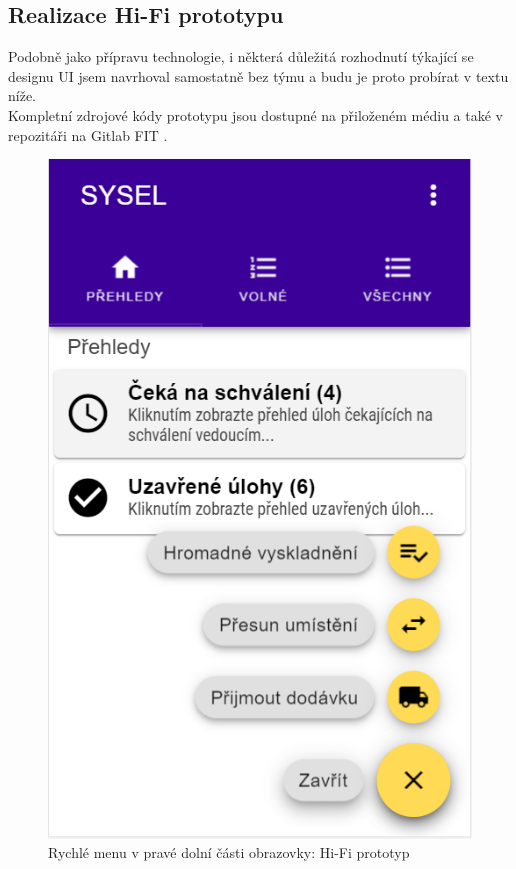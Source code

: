 \subsection{Realizace Hi-Fi prototypu}

Podobně jako přípravu technologie, i některá důležitá rozhodnutí týkající se designu UI jsem navrhoval samostatně bez týmu a budu je proto probírat v textu níže.\\
Kompletní zdrojové kódy prototypu jsou dostupné na přiloženém médiu a také v repozitáři na Gitlab FIT \cite{gitlab-hifi}.\\

\begin{figure}[h]
\includegraphics[height=0.45\textheight]{../png/hifi/fab.png}
\caption{Rychlé menu v pravé dolní části obrazovky: Hi-Fi prototyp} \label{picture:hifi:fab}
\end{figure}

